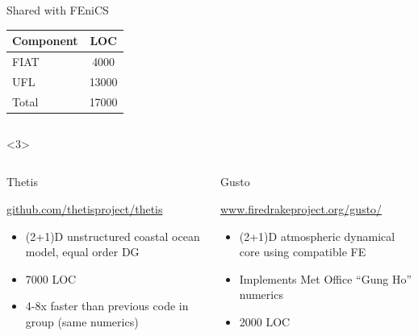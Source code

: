 \documentclass[presentation]{beamer}
\begin{document}
\begin{frame}
\begin{overlayarea}{\textwidth}{0.8\textheight}
\begin{onlyenv}
\begin{columns}
        \begin{column}[t]{0.5\textwidth}
          \begin{block}{Shared with FEniCS}
            \begin{table}
              \centering
              \begin{tabular}{lc}
                Component & LOC   \\
                \hline
                FIAT      & 4000  \\
                UFL       & 13000 \\
                \hline
                Total     & 17000
              \end{tabular}
            \end{table}        
          \end{block}
        \end{column}
      \end{columns}
    \end{onlyenv}
    \begin{onlyenv}<3>
      \begin{columns}
        \begin{column}[t]{0.5\textwidth}
          \begin{block}{Thetis}
            {\small
              {\scriptsize\url{github.com/thetisproject/thetis}}
              \begin{itemize}
              \item (2+1)D unstructured coastal ocean model, equal order DG
              \item 7000 LOC
              \item 4-8x faster than previous code in group (same numerics)
              \end{itemize}
            }
          \end{block}
        \end{column}
        \begin{column}[t]{0.5\textwidth}
          \begin{block}{Gusto}
            {\small
              {\scriptsize\url{www.firedrakeproject.org/gusto/}}
              \begin{itemize}
              \item (2+1)D atmospheric dynamical core using compatible FE
              \item Implements Met Office ``Gung Ho'' numerics
              \item 2000 LOC
              \end{itemize}
            }
          \end{block}
        \end{column}
      \end{columns}
    \end{onlyenv}
  \end{overlayarea}
\end{frame}
\end{document}
